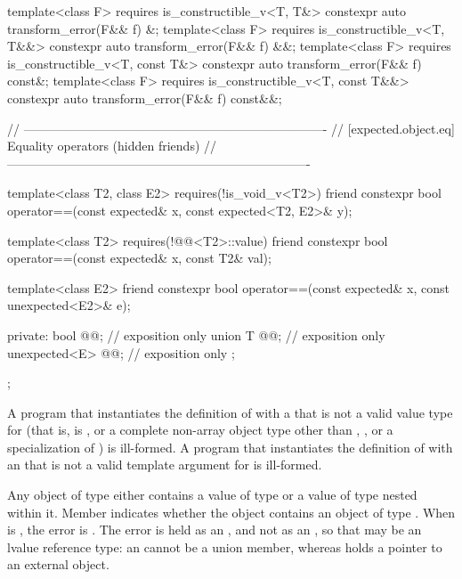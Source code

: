 \begin{codeblock}
{{    template<class F>
      requires is_constructible_v<T, T&>
    constexpr auto transform_error(F&& f) &;
    template<class F>
      requires is_constructible_v<T, T&&>
    constexpr auto transform_error(F&& f) &&;
    template<class F>
      requires is_constructible_v<T, const T&>
    constexpr auto transform_error(F&& f) const&;
    template<class F>
      requires is_constructible_v<T, const T&&>
    constexpr auto transform_error(F&& f) const&&;

    // -------------------------------------------------------------------------
    // [expected.object.eq] Equality operators (hidden friends)
    // -------------------------------------------------------------------------

    template<class T2, class E2>
      requires(!is_void_v<T2>)
    friend constexpr bool operator==(const expected& x, const expected<T2, E2>& y);

    template<class T2>
      requires(!@@<T2>::value)
    friend constexpr bool operator==(const expected& x, const T2& val);

    template<class E2>
    friend constexpr bool operator==(const expected& x, const unexpected<E2>& e);

  private:
    bool @@; // exposition only
    union {
      T @@;              // exposition only
      unexpected<E> @@; // exposition only
    };
  };
}
\end{codeblock}

\begin{itemdescr}
\pnum
\mandates
A program that instantiates the definition of  with a  that is not a valid value type for  (that is,  is , or a complete non-array object type other than , , or a specialization of ) is ill-formed. A program that instantiates the definition of  with an  that is not a valid template argument for  is ill-formed.

\pnum
\remarks
Any object of type  either contains a value of type  or a value of type  nested within it. Member  indicates whether the  object contains an object of type . When  is , the error is . The error is held as an , and not as an , so that  may be an lvalue reference type: an  cannot be a union member, whereas  holds a pointer to an external object.
\end{itemdescr}

